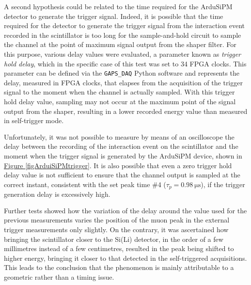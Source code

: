 \par
A second hypothesis could be related to the time required for the ArduSiPM detector to generate the trigger signal. Indeed, it is possible that the time required for the detector to generate the trigger signal from the interaction event recorded in the scintillator is too long for the sample-and-hold circuit to sample the channel at the point of maximum signal output from the shaper filter. For this purpose, various delay values were evaluated, a parameter known as \textit{trigger hold delay}, which in the specific case of this test was set to 34 FPGA clocks. This parameter can be defined via the \texttt{GAPS\_DAQ} Python software and represents the delay, measured in FPGA clocks, that elapses from the acquisition of the trigger signal to the moment when the channel is actually sampled. With this trigger hold delay value, sampling may not occur at the maximum point of the signal output from the shaper, resulting in a lower recorded energy value than measured in self-trigger mode. 

\par
Unfortunately, it was not possible to measure by means of an oscilloscope the delay between the recording of the interaction event on the scintillator and the moment when the trigger signal is generated by the ArduSiPM device, shown in \hyperref[figArduiSiPMtrigger]{Figure \ref{figArduiSiPMtrigger}}. It is also possible that even a zero trigger hold delay value is not sufficient to ensure that the channel output is sampled at the correct instant, consistent with the set peak time \#4 ($\tau_{p} = \SI{0.98}{\micro\second}$), if the trigger generation delay is excessively high.

\par
Further tests showed how the variation of the delay around the value used for the previous measurements varies the position of the muon peak in the external trigger measurements only slightly. On the contrary, it was ascertained how bringing the scintillator closer to the Si(Li) detector, in the order of a few millimetres instead of a few centimetres, resulted in the peak being shifted to higher energy, bringing it closer to that detected in the self-triggered acquisitions. This leads to the conclusion that the phenomenon is mainly attributable to a geometric rather than a timing issue.
